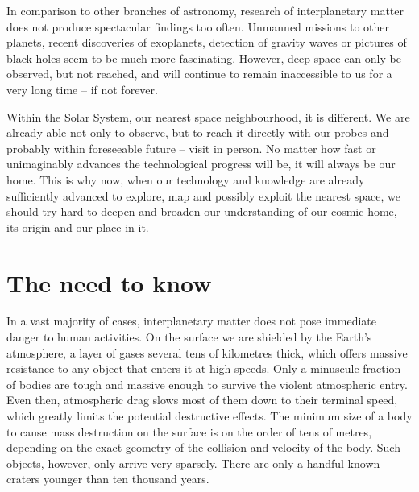
In comparison to other branches of astronomy, research of interplanetary matter
does not produce spectacular findings too often.
Unmanned missions to other planets, recent discoveries of exoplanets, detection of gravity waves
or pictures of black holes seem to be much more fascinating.
However, deep space can only be observed, but not reached, and will continue to remain
inaccessible to us for a very long time -- if not forever.

Within the Solar System, our nearest space neighbourhood, it is different. We are already able not only to observe,
but to reach it directly with our probes and -- probably within foreseeable future -- visit in person.
No matter how fast or unimaginably advances the technological progress will be, it will always be our home.
This is why now, when our technology and knowledge are already sufficiently advanced to explore, map and possibly exploit
the nearest space, we should try hard to deepen and broaden our understanding of our cosmic home, its origin and our place in it.

\section{The need to know} \label{in}
    In a vast majority of cases, interplanetary matter does not pose immediate danger to human activities.
    On the surface we are shielded by the Earth's atmosphere, a layer of gases several tens of kilometres
    thick, which offers massive resistance to any object that enters it at high speeds.
    Only a minuscule fraction of bodies are tough and massive enough to survive the violent atmospheric entry.
    Even then, atmospheric drag slows most of them down to their terminal speed, which greatly limits the potential destructive effects.
    The minimum size of a body to cause mass destruction on the surface is on the order of tens of metres,
    depending on the exact geometry of the collision and velocity of the body. Such objects, however, only arrive very sparsely.
    There are only a handful known craters younger than ten thousand years.


